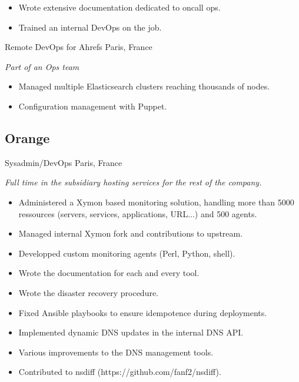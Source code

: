 \documentclass[hidelinks]{friggeri-cv} %
\begin{document}
\begin{entrylist}
{\begin{itemize}
    \item Wrote extensive documentation dedicated to oncall ops.
    \item Trained an internal DevOps on the job.
  \end{itemize}
}
 {Remote DevOps for Ahrefs} {Paris, France} {
  \emph{Part of an Ops team}
  \begin{itemize}
    \item Managed multiple Elasticsearch clusters reaching thousands of nodes.
    \item Configuration management with Puppet.
  \end{itemize}
}
\end{entrylist}

\pagebreak

\subsection{Orange}
\begin{entrylist}
 {Sysadmin/DevOps} {Paris, France} {
  \emph{Full time in the subsidiary hosting services for the rest of the company.}
  \begin{itemize}
    \item Administered a Xymon based monitoring solution, handling more than 5000 ressources (servers, services, applications, URL...) and 500 agents.
    \item Managed internal Xymon fork and contributions to upstream.
    \item Developped custom monitoring agents (Perl, Python, shell).
    \item Wrote the documentation for each and every tool.
    \item Wrote the disaster recovery procedure.
    \item Fixed Ansible playbooks to ensure idempotence during deployments.
    \item Implemented dynamic DNS updates in the internal DNS API.
    \item Various improvements to the DNS management tools.
    \item Contributed to nsdiff (https://github.com/fanf2/nsdiff).
  \end{itemize}
}
\end{entrylist}


\end{document}
